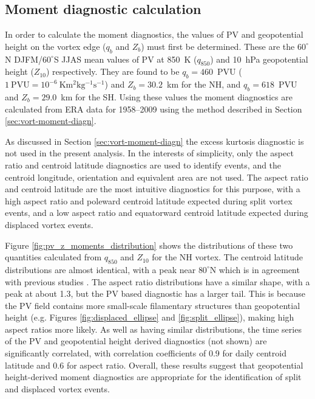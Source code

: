 \subsection{Moment diagnostic calculation}
\label{sec:vort-geom-calc}

In order to calculate the moment diagnostics, the values of PV and geopotential
height on the vortex edge ($q_b$ and $Z_b$) must first be determined. These are
the $60^{\circ}$N DJFM/$60^{\circ}$S JJAS mean values of PV at 850~K ($q_{850}$)
and 10~hPa geopotential height ($Z_{10}$) respectively. They are found to be
$q_b = 460$~PVU ($\mathrm{1~PVU = 10^{-6}~Km^2kg^{-1}s^{-1}}$) and
$Z_b = 30.2$~km for the NH, and $q_b = 618$~PVU and $Z_b = 29.0$~km for the
SH. Using these values the moment diagnostics are calculated from ERA data for
1958--2009 using the method described in Section \ref{sec:vort-moment-diagn}.

As discussed in Section \ref{sec:vort-moment-diagn} the excess kurtosis
diagnostic is not used in the present analysis. In the interests of simplicity,
only the aspect ratio and centroid latitude diagnostics are used to identify
events, and the centroid longitude, orientation and equivalent area are not
used. The aspect ratio and centroid latitude are the most intuitive diagnostics
for this purpose, with a high aspect ratio and poleward centroid latitude
expected during split vortex events, and a low aspect ratio and equatorward
centroid latitude expected during displaced vortex events.

Figure \ref{fig:pv_z_moments_distribution} shows the distributions of these two
quantities calculated from $q_{850}$ and $Z_{10}$ for the NH vortex. The
centroid latitude distributions are almost identical, with a peak near
$80^{\circ}$N which is in agreement with previous studies
\citep{Waugh1999,Mitchell2011}. The aspect ratio distributions have a similar
shape, with a peak at about 1.3, but the PV based diagnostic has a larger
tail. This is because the PV field contains more small-scale filamentary
structures than geopotential height (e.g. Figures \ref{fig:displaced_ellipse}
and \ref{fig:split_ellipse}), making high aspect ratios more likely. As well as
having similar distributions, the time series of the PV and geopotential height
derived diagnostics (not shown) are significantly correlated, with correlation
coefficients of 0.9 for daily centroid latitude and 0.6 for aspect
ratio. Overall, these results suggest that geopotential height-derived moment
diagnostics are appropriate for the identification of split and displaced vortex
events.


